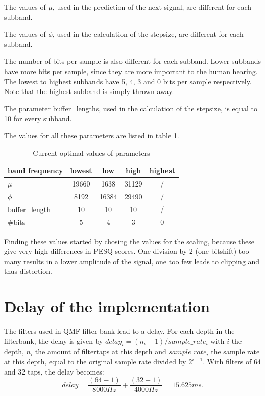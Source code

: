 \documentclass[a4paper]{article}
\begin{document}
The values of $\mu$, used in the prediction of the next signal, are different for each subband. 

The values of $\phi$, used in the calculation of the stepsize, are different for each subband. 

The number of bits per sample is also different for each subband. Lower subbands have more bits per sample, since they are more important to the human hearing. The lowest to highest subbands have 5, 4, 3 and 0 bits per sample respectively. Note that the highest subband is simply thrown away.

The parameter buffer\_lengths, used in the calculation of the stepsize, is equal to 10 for every subband.

The values for all these parameters are listed in table \ref{tab:parametervalues}.

\begin{table}
\begin{tabular}{l|cccc} 
band frequency & lowest & low & high & highest \\ 
\hline 
$\mu$ & 19660 & 1638 & 31129 & / \\  
$\phi$ & 8192 & 16384 & 29490 & / \\  
buffer\_length & 10 & 10 & 10 & / \\  
\#bits & 5 & 4 & 3 & 0 \\ 
\hline 
\end{tabular}
\caption{Current optimal values of parameters}
\label{tab:parametervalues}
\end{table}
Finding these values started by chosing the values for the scaling, because these give very high differences in PESQ scores. One division by 2 (one bitshift) too many results in a lower amplitude of the signal, one too few leads to clipping and thus distortion. 

\section{Delay of the implementation}
The filters used in QMF filter bank lead to a delay. For each depth in the filterbank, the delay is given by $delay_i = (n_i-1) / sample\_rate_i$ with $i$ the depth, $n_i$ the amount of filtertaps at this depth and $sample\_rate_i$ the sample rate at this depth, equal to the original sample rate divided by $2^{i-1}$. With filters of 64 and 32 taps, the delay becomes:
\begin{equation*}
delay = \frac{(64-1)}{8000 Hz} + \frac{(32-1)}{4000 Hz} = 15.625 ms.
\end{equation*}
\end{document}

